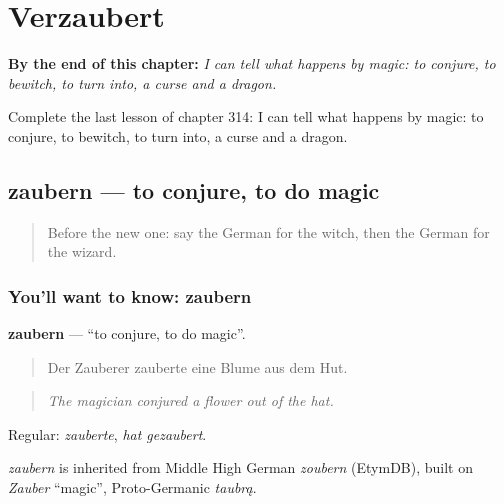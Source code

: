 
\chapter{Verzaubert}
\label{ch:ge-verzaubert}

\begin{chapteropening}
\textbf{By the end of this chapter:} \emph{I can tell what happens by magic: to conjure, to bewitch, to turn into, a curse and a dragon.}

Complete the last lesson of chapter 314: I can tell what happens by magic: to conjure, to bewitch, to turn into, a curse and a dragon.
\end{chapteropening}

\section[zaubern]{zaubern — to conjure, to do magic}

\label{lesson:GE-C314-zaubern}



\begin{quote}
Before the new one: say the German for the witch, then the German for the wizard.
\end{quote}

\subsection*{You'll want to know: zaubern}
\textbf{zaubern} — \textquotedblleft{}to conjure, to do magic\textquotedblright{}.

\begin{quote}
Der Zauberer zauberte eine Blume aus dem Hut.
\end{quote}

\begin{quote}
\emph{The magician conjured a flower out of the hat.}
\end{quote}

Regular: \emph{zauberte}, \emph{hat gezaubert}.

\begin{cousinweb}
\emph{zaubern} is inherited from Middle High German \emph{zoubern} (EtymDB), built on \emph{Zauber} \textquotedblleft{}magic\textquotedblright{}, Proto-Germanic \emph{taubrą}.
\end{cousinweb}

